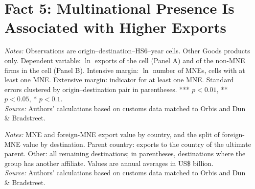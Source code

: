 \documentclass[11pt,a4paper]{article}
\begin{document}
\section{Fact 5: Multinational Presence Is Associated with Higher Exports}\label{sec:f5_rest}
\begin{table}[H]\centering\small%
  \caption{Other Goods: Multinational Presence and Exports}%
  \label{tab:t1_rest}%
  \par\vspace{3pt}%
  \begin{minipage}{0.95\textwidth}\footnotesize %
  \textit{Notes:} Observations are origin--destination--HS6--year cells. Other Goods products only. Dependent variable: $\ln$ exports of the cell (Panel A) and of the non-MNE firms in the cell (Panel B). Intensive margin: $\ln$ number of MNEs, cells with at least one MNE. Extensive margin: indicator for at least one MNE. Standard errors clustered by origin--destination pair in parentheses. *** $p<0.01$, ** $p<0.05$, * $p<0.1$.\\[3pt]%
  \textit{Source:} Authors' calculations based on customs data matched to Orbis and Dun \& Bradstreet.%
  \end{minipage}%
  \end{table}
\begin{table}[H]\centering\small%
  \caption{Other Goods: Multinational Exports by Exporting Country and Destination Type}%
  \label{tab:pres_rest}%
  \par\vspace{3pt}%
  \begin{minipage}{0.95\textwidth}\footnotesize %
  \textit{Notes:} MNE and foreign-MNE export value by country, and the split of foreign-MNE value by destination. Parent country: exports to the country of the ultimate parent. Other: all remaining destinations; in parentheses, destinations where the group has another affiliate. Values are annual averages in US\$ billion.\\[3pt]%
  \textit{Source:} Authors' calculations based on customs data matched to Orbis and Dun \& Bradstreet.%
  \end{minipage}%
  \end{table}
\end{document}
